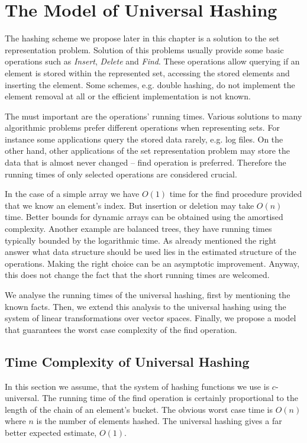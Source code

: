 \chapter{The Model of Universal Hashing}
\label{chapter-proposed-model}

The hashing scheme we propose later in this chapter is a solution to the set representation problem. Solution of this problems usually provide some basic operations such as \emph{Insert}, \emph{Delete} and \emph{Find}. These operations allow querying if an element is stored within the represented set, accessing the stored elements and inserting the element. Some schemes, e.g. double hashing, do not implement the element removal at all or the efficient implementation is not known.

The must important are the operations' running times. Various solutions to many algorithmic problems prefer different operations when representing sets. For instance some applications query the stored data rarely, e.g. log files. On the other hand, other applications of the set representation problem may store the data that is almost never changed -- find operation is preferred. Therefore the running times of only selected operations are considered crucial. 

In the case of a simple array we have $O(1)$ time for the find procedure provided that we know an element's index. But insertion or deletion may take $O(n)$ time. Better bounds for dynamic arrays can be obtained using the amortised complexity. Another example are balanced trees, they have running times typically bounded by the logarithmic time. As already mentioned the right answer what data structure should be used lies in the estimated structure of the operations. Making the right choice can be an asymptotic improvement. Anyway, this does not change the fact that the short running times are welcomed.

We analyse the running times of the universal hashing, first by mentioning the known facts. Then, we extend this analysis to the universal hashing using the system of linear transformations over vector spaces. Finally, we propose a model that guarantees the worst case complexity of the find operation.

\section{Time Complexity of Universal Hashing}
In this section we assume, that the system of hashing functions we use is $c$-universal. The running time of the find operation is certainly proportional to the length of the chain of an element's bucket. The obvious worst case time is $O(n)$ where $n$ is the number of elements hashed. The universal hashing gives a far better expected estimate, $O(1)$.

